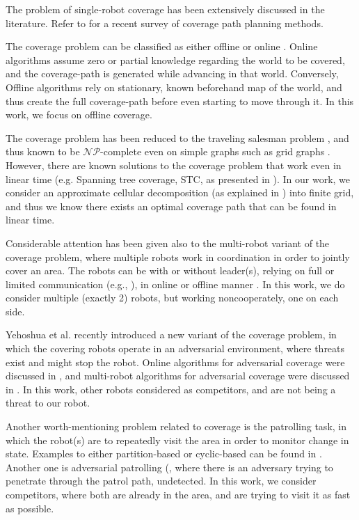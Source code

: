 The problem of single-robot coverage has been extensively discussed in the literature. Refer to \cite{galceran2013survey} for a recent survey of coverage path planning methods.

The coverage problem can be classified as either offline or online \cite{choset2001coverage}.
Online algorithms assume zero or partial knowledge regarding the world to be covered, and the coverage-path is generated while advancing in that world. Conversely, Offline algorithms rely on stationary, known beforehand map of the world, and thus create the full coverage-path before even starting to move through it. In this work, we focus on offline coverage.

The coverage problem has been reduced to the traveling salesman problem \cite{arkin2000approximation}, and thus known to be $\mathcal{NP}$-complete even on simple graphs such as grid graphs \cite{papadimitriou1977euclidean}. However, there are known solutions to the coverage problem that work even in linear time (e.g. Spanning tree coverage, STC, as presented in \cite{gabriely2001spanning}). In our work, we consider an approximate cellular decomposition (as explained in \cite{galceran2013survey}) into finite grid, and thus we know there exists an optimal coverage path that can be found in linear time.

Considerable attention has been given also to the multi-robot variant of the coverage problem, where multiple robots work in coordination in order to jointly cover an area. The robots can be with or without leader(s), relying on full or limited communication (e.g., \cite{agmon2008giving}), in online or offline manner \cite{agmon2008giving, de2005blind}.
In this work, we do consider multiple (exactly 2) robots, but working noncooperately, one on each side.

Yehoshua et al. \cite{yehoshua2013robotic} recently introduced a new variant of the coverage problem, in which the covering robots operate in an adversarial environment, where threats exist and might stop the robot. Online algorithms for adversarial coverage were discussed in  \cite{yehoshua2015online}, and multi-robot algorithms for adversarial coverage were discussed in \cite{yehoshua2016multi}. 
In this work, other robots considered as competitors, and are not being a threat to our robot.

Another worth-mentioning problem related to coverage is the patrolling task, in which the robot(s) are to repeatedly visit the area in order to monitor change in state. Examples to either partition-based or cyclic-based can be found in \cite{guo2004towards, guo2004coverage, jung2002tracking, chevaleyre2004theoretical}.
Another one is adversarial patrolling (\cite{agmon2011multi, sless2014multi, agmon2008multi}, where there is an adversary trying to penetrate through the patrol path, undetected. In this work, we consider competitors, where both are already in the area, and are trying to visit it as fast as possible.

